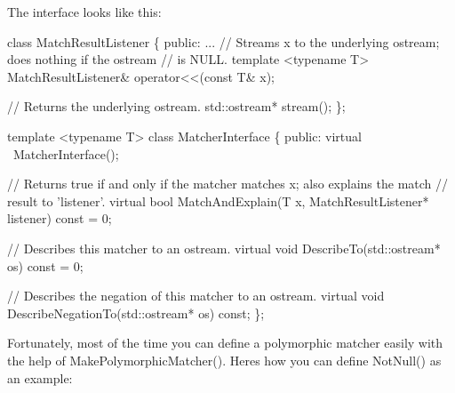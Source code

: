 The interface looks like this\+:


\begin{DoxyCode}
\textcolor{keyword}{class }MatchResultListener \{
 \textcolor{keyword}{public}:
  ...
  \textcolor{comment}{// Streams x to the underlying ostream; does nothing if the ostream}
  \textcolor{comment}{// is NULL.}
  \textcolor{keyword}{template} <\textcolor{keyword}{typename} T>
  MatchResultListener& operator<<(\textcolor{keyword}{const} T& x);

  \textcolor{comment}{// Returns the underlying ostream.}
  std::ostream* stream();
\};

\textcolor{keyword}{template} <\textcolor{keyword}{typename} T>
\textcolor{keyword}{class }MatcherInterface \{
 \textcolor{keyword}{public}:
  \textcolor{keyword}{virtual} ~MatcherInterface();

  \textcolor{comment}{// Returns true if and only if the matcher matches x; also explains the match}
  \textcolor{comment}{// result to 'listener'.}
  \textcolor{keyword}{virtual} \textcolor{keywordtype}{bool} MatchAndExplain(T x, MatchResultListener* listener) \textcolor{keyword}{const} = 0;

  \textcolor{comment}{// Describes this matcher to an ostream.}
  \textcolor{keyword}{virtual} \textcolor{keywordtype}{void} DescribeTo(std::ostream* os) \textcolor{keyword}{const} = 0;

  \textcolor{comment}{// Describes the negation of this matcher to an ostream.}
  \textcolor{keyword}{virtual} \textcolor{keywordtype}{void} DescribeNegationTo(std::ostream* os) \textcolor{keyword}{const};
\};
\end{DoxyCode}


Fortunately, most of the time you can define a polymorphic matcher easily with the help of {\ttfamily Make\+Polymorphic\+Matcher()}. Here\textquotesingle{}s how you can define {\ttfamily Not\+Null()} as an example\+:


